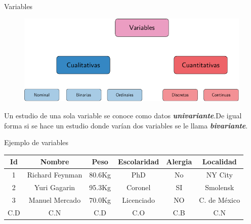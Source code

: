\documentclass[11pt]{beamer}
\begin{document}
    \begin{frame}{Variables}
      \begin{figure}
        \centering
        \includegraphics[width=1\linewidth]{images/Lecture_1c}
        \label{fig:variables}
      \end{figure}
      \pause
      Un estudio de una sola variable se conoce como datos \textbf{\textit{univariante}}.De igual forma si se hace un estudio donde varían dos variables se le llama \textit{\textbf{bivariante}}.
    \end{frame}

    \begin{frame}{Ejemplo de variables}
        \centering
        \begin{tabular}{|c|c|c|c|c|c|}
            \hline
            Id & Nombre & Peso & Escolaridad & Alergia & Localidad \\
            \hline
            1 & Richard Feynman & 80.6Kg & PhD & No & NY City \\
            \hline
            2 & Yuri Gagarin  & 95.3Kg & Coronel & SI & Smolensk  \\
            \hline
            3 & Manuel Mercado & 70.0Kg & Licenciado & NO  & C. de México \\
            \hline
            C.D & C.N  & C.D & C.O & C.B & C.N \\
            \hline
        \end{tabular}
    \end{frame}
\end{document}
